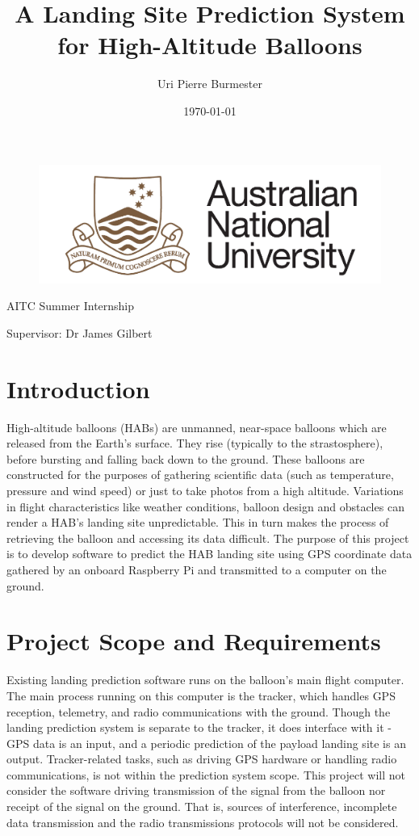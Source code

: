\documentclass[11pt]{article}
\title{A Landing Site Prediction System for High-Altitude Balloons \large}
\author{Uri Pierre Burmester}
\date{\today}
\begin{document}
\begin{figure} \centering
  \includegraphics[width=0.5\linewidth]{ANU.png}
\end{figure}

\maketitle

\centerline{AITC Summer Internship}  
\centerline{Supervisor: Dr James Gilbert} 

\newpage

\tableofcontents

\newpage

\section{Introduction}
High-altitude balloons (HABs) are unmanned, near-space balloons which are released from the Earth's surface. They rise (typically to the strastosphere), before bursting and falling back down to the ground. These balloons are constructed for the purposes of gathering scientific data (such as temperature, pressure and wind speed) or just to take photos from a high altitude. Variations in flight characteristics like weather conditions, balloon design and obstacles can render a HAB's landing site unpredictable. This in turn makes the process of retrieving the balloon and accessing its data difficult. The purpose of this project is to develop software to predict the HAB landing site using GPS coordinate data gathered by an onboard Raspberry Pi and transmitted to a computer on the ground. 

\section{Project Scope and Requirements}

Existing landing prediction software runs on the balloon's main flight computer.  The main process running on this computer is the tracker, which handles GPS reception, telemetry, and radio communications with the ground. Though the landing prediction system is separate to the tracker, it does interface with it -  GPS data is an input, and a periodic prediction of the payload landing site is an output.  Tracker-related tasks, such as driving GPS hardware or handling radio communications, is not within the prediction system scope. This project will not consider the software driving transmission of the signal from the balloon nor receipt of the signal on the ground. That is, sources of interference, incomplete data transmission and the radio transmissions protocols will not be considered. 
\end{document}
